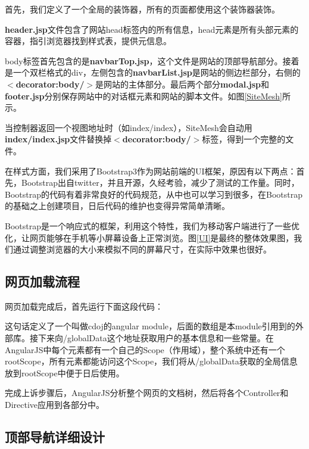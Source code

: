 首先，我们定义了一个全局的装饰器，所有的页面都使用这个装饰器装饰。



\textbf{header.jsp}文件包含了网站head标签内的所有信息，head元素是所有头部元素的容器，指引浏览器找到样式表，提供元信息。


body标签首先包含的是\textbf{navbarTop.jsp}，这个文件是网站的顶部导航部分。接着是一个双栏格式的div，左侧包含的\textbf{navbarList.jsp}是网站的侧边栏部分，右侧的\textbf{$<$decorator:body/$>$}是网站的主体部分。最后两个部分\textbf{modal.jsp}和\textbf{footer.jsp}分别保存网站中的对话框元素和网站的脚本文件。如图\ref{SiteMesh}所示。

当控制器返回一个视图地址时（如index/index），SiteMesh会自动用\textbf{index/index.jsp}文件替换掉\textbf{$<$decorator:body/$>$}标签，得到一个完整的文件。


在样式方面，我们采用了Bootstrap3作为网站前端的UI框架，原因有以下两点：首先，Bootstrap出自twitter，并且开源，久经考验，减少了测试的工作量。同时，Bootstrap的代码有着非常良好的代码规范，从中也可以学习到很多，在Bootstrap的基础之上创建项目，日后代码的维护也变得异常简单清晰。

Bootstrap是一个响应式的框架，利用这个特性，我们为移动客户端进行了一些优化，让网页能够在手机等小屏幕设备上正常浏览。图\ref{UI}是最终的整体效果图，我们通过调整浏览器的大小来模拟不同的屏幕尺寸，在实际中效果也很好。

\subsection{网页加载流程}
网页加载完成后，首先运行下面这段代码：



这句话定义了一个叫做cdoj的angular module，后面的数组是本module引用到的外部库。接下来向/globalData这个地址获取用户的基本信息和一些常量。在AngularJS中每个元素都有一个自己的Scope（作用域），整个系统中还有一个rootScope，所有元素都能访问这个Scope，我们将从/globalData获取的全局信息放到rootScope中便于日后使用。



完成上诉步骤后，AngularJS分析整个网页的文档树，然后将各个Controller和Directive应用到各部分中。

\subsection{顶部导航详细设计}
